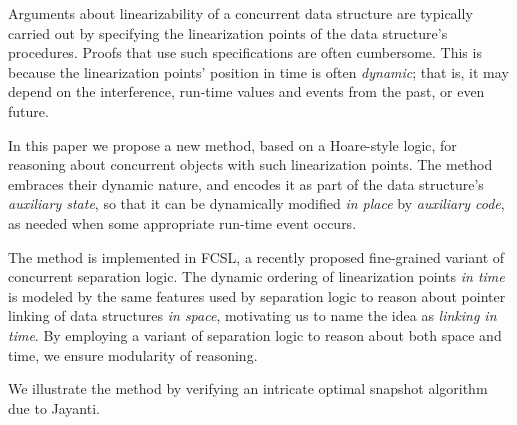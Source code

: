 \begin{comment}
Arguments about linearizability of a concurrent data structure are
typically carried out by specifying the structure methods'
linearization points.
%
Carrying proofs out of such specification is often cumbersome, because
the linearization points' position in time is ofthen \emph{dynamic},
that is, it may depend on the interference, run-time values and events
from the past, or even future.

In this paper we propose a new method, based on a Hoare-style logic,
for reasoning about concurrent objects with such linearization
points. The method embraces their dynamic nature, and encodes it as
part of the structure's \emph{auxiliary state}, so that it can be
dynamically changed by \emph{auxiliary code}, \emph{in place}.

The method is implemented in FCSL, a recently proposed fine-grained
variant of concurrent separation logic. The dynamic temporal ordering
is modeled by the same logical features of separation logic, which are
used to specify spatial linking of data structures via pointers,
motivating us to name the idea as \emph{linking in time}. By employing
a variant of separation logic to reason about both space and time, we
ensure modularity of reasoning.

We illustrate the method by verifying an intricate optimal snapshot
algorithm due to Jayanti.
\end{comment}

Arguments about linearizability of a concurrent data structure are
typically carried out by specifying the linearization points of the
data structure's procedures.
%
Proofs that use such specifications are often cumbersome.  This is
because the linearization points' position in time is
often \emph{dynamic}; that is, it may depend on the interference,
run-time values and events from the past, or even future.

In this paper we propose a new method, based on a Hoare-style logic,
for reasoning about concurrent objects with such linearization
points. The method embraces their dynamic nature, and encodes it as
part of the data structure's \emph{auxiliary state}, so that it can be
dynamically modified \emph{in place} by \emph{auxiliary code}, as
needed when some appropriate run-time event occurs.

The method is implemented in FCSL, a recently proposed fine-grained
variant of concurrent separation logic. The dynamic ordering of
linearization points \emph{in time} is modeled by the same features
used by separation logic to reason about pointer linking of data
structures \emph{in space}, motivating us to name the idea
as \emph{linking in time}. By employing a variant of separation logic
to reason about both space and time, we ensure modularity of
reasoning.

We illustrate the method by verifying an intricate optimal snapshot
algorithm due to Jayanti.


